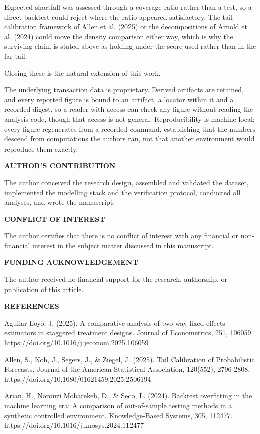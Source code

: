 \documentclass[12pt,a4paper]{article}
\newcommand{\mainhead}[1]{%
  \par\vspace{10pt}\noindent\textbf{\MakeUppercase{#1}}\par\vspace{2pt}}
\begin{document}
Expected shortfall was assessed through a coverage ratio rather than a test, so a direct backtest could reject where the ratio appeared satisfactory. The tail-calibration framework of Allen et al. (2025) or the decompositions of Arnold et al. (2024) could move the density comparison either way, which is why the surviving claim is stated above as holding under the score used rather than in the far tail.

Closing these is the natural extension of this work.

The underlying transaction data is proprietary. Derived artifacts are retained, and every reported figure is bound to an artifact, a locator within it and a recorded digest, so a reader with access can check any figure without reading the analysis code, though that access is not general. Reproducibility is machine-local: every figure regenerates from a recorded command, establishing that the numbers descend from computations the authors ran, not that another environment would reproduce them exactly.

\mainhead{Author's Contribution}

The author conceived the research design, assembled and validated the dataset, implemented the modelling stack and the verification protocol, conducted all analyses, and wrote the manuscript.

\mainhead{Conflict of Interest}

The author certifies that there is no conflict of interest with any financial or non-financial interest in the subject matter discussed in this manuscript.

\mainhead{Funding Acknowledgement}

The author received no financial support for the research, authorship, or publication of this article.

\mainhead{REFERENCES}

Aguilar-Loyo, J. (2025). A comparative analysis of two-way fixed effects estimators in staggered treatment designs. Journal of Econometrics, 251, 106059. https://doi.org/10.1016/j.jeconom.2025.106059

Allen, S., Koh, J., Segers, J., \& Ziegel, J. (2025). Tail Calibration of Probabilistic Forecasts. Journal of the American Statistical Association, 120(552), 2796-2808. https://doi.org/10.1080/01621459.2025.2506194

Arian, H., Norouzi Mobarekeh, D., \& Seco, L. (2024). Backtest overfitting in the machine learning era: A comparison of out-of-sample testing methods in a synthetic controlled environment. Knowledge-Based Systems, 305, 112477. https://doi.org/10.1016/j.knosys.2024.112477
\end{document}
